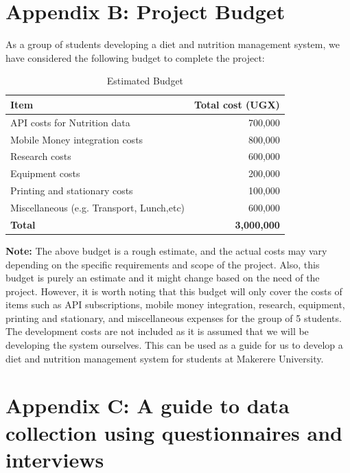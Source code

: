 \documentclass {article}
\begin{document}
\newpage
\section{Appendix B: Project Budget}
\noindent As a group of students developing a diet and nutrition management system, we have considered the following budget to complete the project: \\

\begin{table}[h]
\caption{Estimated Budget}
\label{budget}
\begin{Large}
\begin{center}
\begin{tabular}{|l|r|}

\hline
\textbf{Item} & \textbf{Total cost (UGX)} \\ \hline
API costs for Nutrition data & 700,000 \\ \hline
Mobile Money integration costs & 800,000 \\ \hline
Research costs & 600,000 \\ \hline
Equipment costs & 200,000 \\ \hline
Printing and stationary costs & 100,000 \\ \hline
Miscellaneous (e.g. Transport, Lunch,etc) & 600,000 \\ \hline
\textbf{Total} & \textbf{3,000,000} \\ \hline
\end{tabular}
\end{center}
\end{Large}
\end{table}
\vspace{10pt}
\textbf{Note:} The above budget is a rough estimate, and the actual costs may vary depending on the specific requirements and scope of the project. Also, this budget is purely an estimate and it might change based on the need of the project. However, it is worth noting that this budget will only cover the costs of items such as API subscriptions, mobile money integration, research, equipment, printing and stationary, and miscellaneous expenses for the group of 5 students. The development costs are not included as it is assumed that we will be developing the system ourselves. This can be used as a guide for us to develop a diet and nutrition management system for students at Makerere University.


\newpage
\section{Appendix C: A guide to data collection using questionnaires and interviews}
\end{document}
